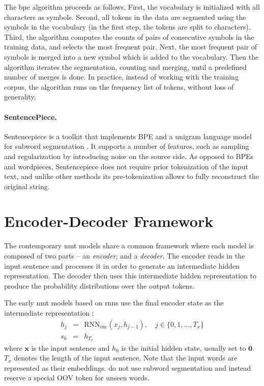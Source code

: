 The \acrshort{bpe} algorithm %
proceeds as follows. First, the vocabulary is initialized with all characters
as symbols. Second, all tokens in the data are segmented using the symbols in
the vocabulary (in the first step, the tokens are split to characters).  Third,
the algorithm computes the counts of pairs of consecutive symbols in the
training data, and selects the most frequent pair. Next, the most frequent pair
of symbols is merged into a new symbol which is added to the vocabulary. Then
the algorithm iterates the segmentation, counting and merging, until a
predefined number of merges is done. In practice, instead of working with the
training corpus, the algorithm runs on the frequency list of tokens, without
loss of generality.

\paragraph{SentencePiece.}   Sentencepiece
\citep{kudo2018sentencepiece} is a toolkit that implements BPE and a unigram
language model for subword segmentation \citep{kudo-2018-subword}. It supports a
number of features, such as sampling and regularization by introducing noise on
the source side. As opposed to BPEs and wordpieces, Sentencepiece does not
require prior tokenization of the input text, and unlike other methods its
pre-tokenization allows to fully reconstruct the original string.

\section{Encoder-Decoder Framework}
\label{sec:encdec}

The contemporary \gls{nmt} models share a common framework where each model is
composed of two parts -- an \emph{encoder}, and a \emph{decoder}. The encoder
reads in the input sentence and processes it in order to generate an
intermediate hidden representation.  The decoder then uses this intermediate
hidden representation to produce the probability distributions over the output
tokens.

The early \gls{nmt} models based on \glspl{rnn} use the final encoder state as
the intermediate representation \citep{sutskever2014sequence}:
%
\begin{align} h_j & = & \mathrm{RNN}_{\text{enc}}(x_j, h_{j-1}), \quad j \in
\{0, 1, \ldots, T_x \} \\ s_0 & = & h_{T_x}
\end{align}
%
where $\mathbf{x}$ is the input sentence and $h_0$ is the initial hidden state,
usually set to $\mathbf{0}$. $T_x$ denotes the length of the input sentence.
Note that the input words are represented as their embeddings.
\citet{sutskever2014sequence} do not use subword segmentation and instead
reserve a special OOV token for unseen words.

